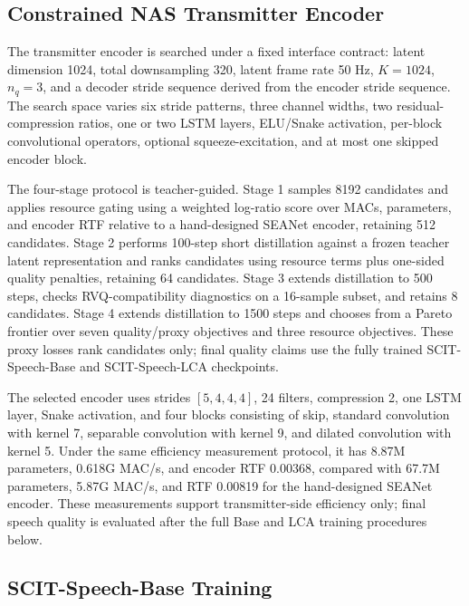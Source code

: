 ﻿\documentclass[conference]{IEEEtran}
\newcommand{\base}{SCIT-Speech-Base}
\newcommand{\lca}{SCIT-Speech-LCA}
\begin{document}
\subsection{Constrained NAS Transmitter Encoder}

The transmitter encoder is searched under a fixed interface contract: latent dimension 1024, total downsampling 320, latent frame rate 50 Hz, \(K=1024\), \(n_q=3\), and a decoder stride sequence derived from the encoder stride sequence. The search space varies six stride patterns, three channel widths, two residual-compression ratios, one or two LSTM layers, ELU/Snake activation, per-block convolutional operators, optional squeeze-excitation, and at most one skipped encoder block.

The four-stage protocol is teacher-guided. Stage 1 samples 8192 candidates and applies resource gating using a weighted log-ratio score over MACs, parameters, and encoder RTF relative to a hand-designed SEANet encoder, retaining 512 candidates. Stage 2 performs 100-step short distillation against a frozen teacher latent representation and ranks candidates using resource terms plus one-sided quality penalties, retaining 64 candidates. Stage 3 extends distillation to 500 steps, checks RVQ-compatibility diagnostics on a 16-sample subset, and retains 8 candidates. Stage 4 extends distillation to 1500 steps and chooses from a Pareto frontier over seven quality/proxy objectives and three resource objectives. These proxy losses rank candidates only; final quality claims use the fully trained \base{} and \lca{} checkpoints.

The selected encoder uses strides \([5,4,4,4]\), 24 filters, compression 2, one LSTM layer, Snake activation, and four blocks consisting of skip, standard convolution with kernel 7, separable convolution with kernel 9, and dilated convolution with kernel 5. Under the same efficiency measurement protocol, it has 8.87M parameters, 0.618G MAC/s, and encoder RTF 0.00368, compared with 67.7M parameters, 5.87G MAC/s, and RTF 0.00819 for the hand-designed SEANet encoder. These measurements support transmitter-side efficiency only; final speech quality is evaluated after the full Base and LCA training procedures below.

\subsection{\base{} Training}
\end{document}
